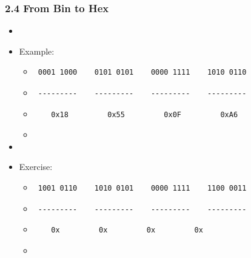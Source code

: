 \begin{frame}[fragile]
  \frametitle{2.4 From Bin to Hex}
    \begin{itemize}
        \item[]
        \item[] Example:
            \begin{itemize}
                \item[] \begin{verbatim} 0001 1000    0101 0101    0000 1111    1010 0110\end{verbatim}
                \item[] \begin{verbatim} ---------    ---------    ---------    ---------\end{verbatim}
                \item[] \begin{verbatim}    0x18         0x55         0x0F         0xA6  \end{verbatim}
                \item[] 
            \end{itemize}
        \item[]
        \item[] Exercise:
            \begin{itemize}
                \item[] \begin{verbatim} 1001 0110    1010 0101    0000 1111    1100 0011\end{verbatim}
                \item[] \begin{verbatim} ---------    ---------    ---------    ---------\end{verbatim}
                \item[] \begin{verbatim}    0x         0x         0x         0x  \end{verbatim}
                \item[] 
            \end{itemize}
    \end{itemize}
\end{frame}


